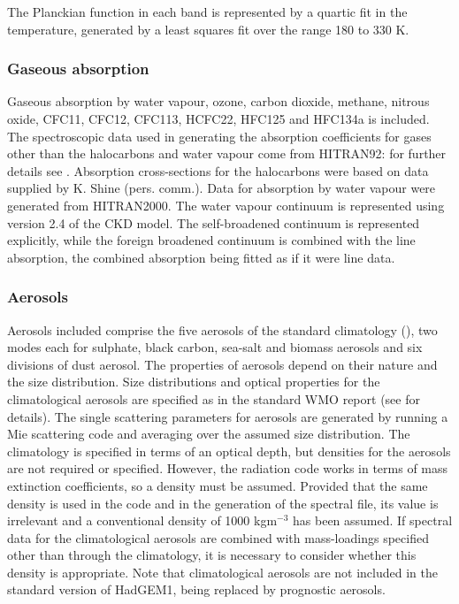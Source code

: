 The Planckian function in each band is represented by a quartic fit
in the temperature, generated by a least squares fit over the range
180 to 330 K.

\subsubsection*{Gaseous absorption}

Gaseous absorption by water vapour, ozone, carbon dioxide, methane, 
nitrous oxide, CFC11, CFC12, CFC113, HCFC22, HFC125 and HFC134a is 
included. The spectroscopic data used in generating the absorption 
coefficients for gases other than the halocarbons and water vapour 
come from HITRAN92: 
for further details see \citet{Cusack99ck}. Absorption
cross-sections for the halocarbons were based on data supplied by
K. Shine (pers. comm.).
Data for absorption by water vapour were generated from HITRAN2000.
The water vapour continuum is represented 
using version 2.4 of the CKD model. The self-broadened continuum is
represented explicitly, while the foreign broadened continuum is
combined with the line absorption, the combined absorption being
fitted as if it were line data.

\subsubsection*{Aerosols}

Aerosols included comprise the five aerosols of the standard climatology
(\citet{Cusack98a}), two modes each for sulphate, black carbon,
sea-salt and biomass aerosols and six divisions of dust aerosol.
The properties of aerosols depend on their nature and the size distribution.
Size distributions and optical properties for the climatological aerosols
are specified as in the standard WMO report (see \citet{Cusack98a} for
details). 
The single scattering parameters for aerosols are generated by running a 
Mie scattering code and averaging over the assumed size distribution.
The climatology is specified in terms of an optical depth, but densities
for the aerosols are not required or specified. However, the radiation
code works in terms of mass extinction coefficients, so a density must
be assumed. Provided that the same density is used in the code and in
the generation of the spectral file, its value is irrelevant and a 
conventional density of 1000 kgm${}^{-3}$ has been assumed. If spectral
data for the climatological aerosols are combined with mass-loadings
specified other than through the climatology, it is necessary to
consider whether this density is appropriate. Note that climatological
aerosols are not included in the standard version of HadGEM1, being
replaced by prognostic aerosols.

